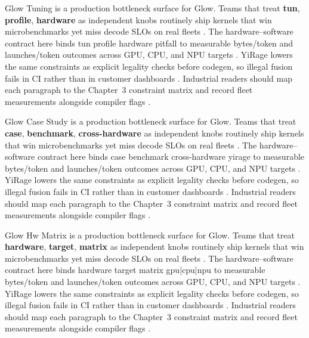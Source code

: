 Glow Tuning is a production bottleneck surface for Glow. Teams that treat \textbf{tun}, \textbf{profile}, \textbf{hardware} as independent knobs routinely ship kernels that win microbenchmarks yet miss decode SLOs on real fleets \citep{nvidia2024cudagraphs,taxbreak2026}. The hardware--software contract here binds tun profile hardware pitfall to measurable bytes/token and launches/token outcomes across GPU, CPU, and NPU targets \citep{liu2024deepseekv3,memoryfloor2026}. YiRage lowers the same constraints as explicit legality checks before codegen, so illegal fusion fails in CI rather than in customer dashboards \citep{patel2025llminference,nvidia2022hopper}. Industrial readers should map each paragraph to the Chapter~3 constraint matrix and record fleet measurements alongside compiler flags \citep{taxbreak2026,semianalysis2024tma}.

Glow Case Study is a production bottleneck surface for Glow. Teams that treat \textbf{case}, \textbf{benchmark}, \textbf{cross-hardware} as independent knobs routinely ship kernels that win microbenchmarks yet miss decode SLOs on real fleets \citep{liu2024deepseekv3,memoryfloor2026}. The hardware--software contract here binds case benchmark cross-hardware yirage to measurable bytes/token and launches/token outcomes across GPU, CPU, and NPU targets \citep{patel2025llminference,nvidia2022hopper}. YiRage lowers the same constraints as explicit legality checks before codegen, so illegal fusion fails in CI rather than in customer dashboards \citep{taxbreak2026,semianalysis2024tma}. Industrial readers should map each paragraph to the Chapter~3 constraint matrix and record fleet measurements alongside compiler flags \citep{memoryfloor2026,amd2024xdna}.

Glow Hw Matrix is a production bottleneck surface for Glow. Teams that treat \textbf{hardware}, \textbf{target}, \textbf{matrix} as independent knobs routinely ship kernels that win microbenchmarks yet miss decode SLOs on real fleets \citep{patel2025llminference,nvidia2022hopper}. The hardware--software contract here binds hardware target matrix gpu|cpu|npu to measurable bytes/token and launches/token outcomes across GPU, CPU, and NPU targets \citep{taxbreak2026,semianalysis2024tma}. YiRage lowers the same constraints as explicit legality checks before codegen, so illegal fusion fails in CI rather than in customer dashboards \citep{memoryfloor2026,amd2024xdna}. Industrial readers should map each paragraph to the Chapter~3 constraint matrix and record fleet measurements alongside compiler flags \citep{nvidia2022hopper,amd2024aie}.

